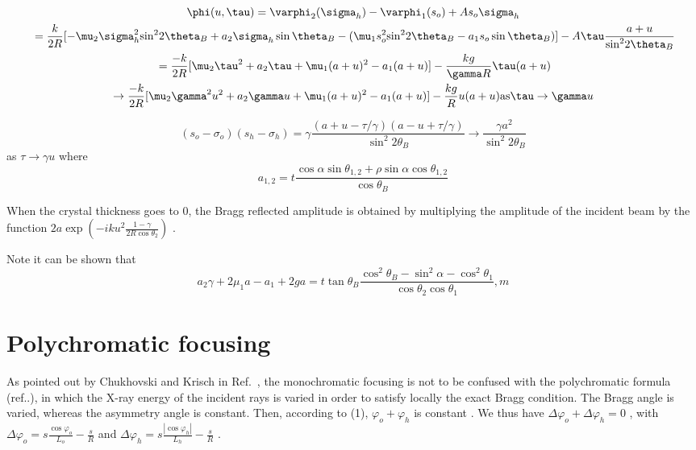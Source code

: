 \documentclass{iucr}              %
\begin{document}
\begin{multline}
\phi (u,\tau ) = {\varphi _2}({\sigma _h}) - {\varphi _1}({s_o}) + A{s_o}{\sigma _h}\\
{\rm{     }} = \frac{k}{{2R}}[ - {\mu _2}\sigma _h^2{\sin ^2}2{\theta _B} + {a_2}{\sigma _h}\sin {\theta _B} - ({\mu _1}s_o^2{\sin ^2}2{\theta _B} - {a_1}{s_o}\sin {\theta _B})] - A\tau \frac{{a + u}}{{{{\sin }^2}2{\theta _B}}}\\
{\rm{    }} = \frac{{ - k}}{{2R}}[{\mu _2}{\tau ^2} + {a_2}\tau  + {\mu _1}{(a + u)^2} - {a_1}(a + u)] - \frac{{kg}}{{\gamma R}}\tau (a + u)\\
 \to \frac{{ - k}}{{2R}}[{\mu _2}{\gamma ^2}{u^2} + {a_2}\gamma u + {\mu _1}{(a + u)^2} - {a_1}(a + u)] - \frac{{kg}}{R}u(a + u){\rm{  as }}\tau  \to \gamma u
\end{multline}

\begin{equation}
({s_o} - {\sigma _o})({s_h} - {\sigma _h}) = \gamma \frac{{(a + u - \tau /\gamma )(a - u + \tau /\gamma )}}{{{{\sin }^2}2{\theta _B}}} \to \frac{{\gamma {a^2}}}{{{{\sin }^2}2{\theta _B}}}
\end{equation}
as   $\tau  \to \gamma u$
where 
\begin{equation}
{a_{1,2}} = t\frac{{\cos \alpha \sin {\theta _{1,2}} + \rho \sin \alpha \cos {\theta _{1,2}}}}{{\cos {\theta _B}}}
\end{equation}

When the crystal thickness goes to 0, the Bragg reflected amplitude is obtained by multiplying the amplitude of the incident beam by the function  $2a\exp ( - ik{u^2}\frac{{1 - \gamma }}{{2R\cos {\theta _2}}})$ . 

Note it can be shown that   
\begin{equation}
 {a_2}\gamma  + 2{\mu _1}a - {a_1} + 2ga = t\tan {\theta _B}\frac{{{{\cos }^2}{\theta _B} - {{\sin }^2}\alpha  - {{\cos }^2}{\theta _1}}}{{\cos {\theta _2}\cos {\theta _1}}},m
\end{equation}


\section{Polychromatic focusing}

As pointed out by Chukhovski and Krisch in Ref.~\cite{CK}, the monochromatic focusing is not to be confused with the polychromatic formula (ref..), in which the X-ray energy of the incident rays is varied in order to satisfy locally the exact Bragg condition. The Bragg angle is varied, whereas the asymmetry angle is constant. Then, according to (1),   ${\varphi _o} + {\varphi _h}$  is constant . We thus have  $\Delta {\varphi _o} + \Delta {\varphi _h} = 0$ , with  $\Delta {\varphi _o} = s\frac{{\cos {\varphi _o}}}{{{L_o}}} - \frac{s}{R}$  and $\Delta {\varphi _h} = s\frac{{\left| {\cos {\varphi _h}} \right|}}{{{L_h}}} - \frac{s}{R}$ .
\end{document}
